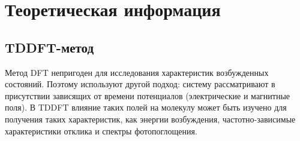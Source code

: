 \section{Теоретическая информация}
\subsection{TDDFT-метод}
Метод DFT непригоден для исследования характеристик возбужденных состояний. Поэтому используют другой подход: систему рассматривают в присутствии зависящих от времени потенциалов (электрические и магнитные поля). В TDDFT влияние таких полей на молекулу может быть изучено для получения таких характеристик, как энергии возбуждения, частотно-зависимые характеристики отклика и спектры фотопоглощения. 